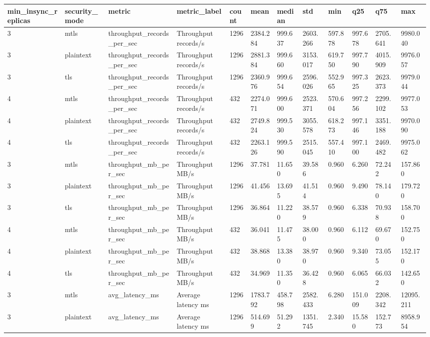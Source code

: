 \begin{longtable}{llllllllllll}
\hline
min\_insync\_replicas & security\_mode & metric & metric\_label & count & mean & median & std & min & q25 & q75 & max \\
\hline
3 & mtls & throughput\_records\_per\_sec & Throughput records/s & 1296 & 2384.284 & 999.637 & 2603.266 & 597.878 & 997.678 & 2705.641 & 9980.040 \\
3 & plaintext & throughput\_records\_per\_sec & Throughput records/s & 1296 & 2881.384 & 999.660 & 3153.017 & 619.750 & 997.790 & 4015.909 & 9976.057 \\
3 & tls & throughput\_records\_per\_sec & Throughput records/s & 1296 & 2360.976 & 999.654 & 2596.026 & 552.965 & 997.325 & 2623.373 & 9979.044 \\
4 & mtls & throughput\_records\_per\_sec & Throughput records/s & 432 & 2274.071 & 999.600 & 2523.371 & 570.604 & 997.256 & 2299.102 & 9977.053 \\
4 & plaintext & throughput\_records\_per\_sec & Throughput records/s & 432 & 2749.824 & 999.530 & 3055.578 & 618.273 & 997.146 & 3351.188 & 9970.090 \\
4 & tls & throughput\_records\_per\_sec & Throughput records/s & 432 & 2263.126 & 999.590 & 2515.045 & 557.410 & 997.100 & 2469.482 & 9975.062 \\
3 & mtls & throughput\_mb\_per\_sec & Throughput MB/s & 1296 & 37.781 & 11.650 & 39.586 & 0.960 & 6.260 & 72.242 & 157.860 \\
3 & plaintext & throughput\_mb\_per\_sec & Throughput MB/s & 1296 & 41.456 & 13.695 & 41.514 & 0.960 & 9.490 & 78.140 & 179.720 \\
3 & tls & throughput\_mb\_per\_sec & Throughput MB/s & 1296 & 36.864 & 11.220 & 38.579 & 0.960 & 6.338 & 70.938 & 158.700 \\
4 & mtls & throughput\_mb\_per\_sec & Throughput MB/s & 432 & 36.041 & 11.475 & 38.000 & 0.960 & 6.112 & 69.670 & 152.750 \\
4 & plaintext & throughput\_mb\_per\_sec & Throughput MB/s & 432 & 38.868 & 13.380 & 38.970 & 0.960 & 9.340 & 73.055 & 152.170 \\
4 & tls & throughput\_mb\_per\_sec & Throughput MB/s & 432 & 34.969 & 11.350 & 36.428 & 0.960 & 6.065 & 66.032 & 142.650 \\
3 & mtls & avg\_latency\_ms & Average latency ms & 1296 & 1783.792 & 458.798 & 2582.433 & 6.280 & 151.009 & 2208.342 & 12095.211 \\
3 & plaintext & avg\_latency\_ms & Average latency ms & 1296 & 514.699 & 51.292 & 1351.745 & 2.340 & 15.580 & 152.773 & 8958.954 \\

\end{longtable}
